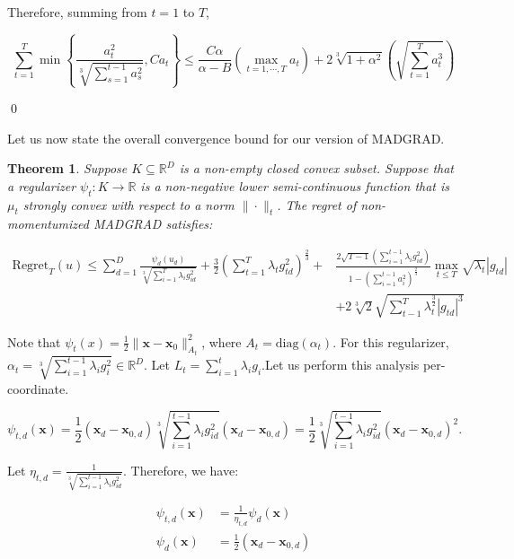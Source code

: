 \documentclass{article}
\newtheorem{theorem}{Theorem}[section]
\newcommand{\R}{\mathbb{R}}
\newcommand{\Regret}{\text{Regret}}
\newcommand{\diag}{\text{diag}}
\newcommand{\bx}{\mathbf{x}}
\begin{document}
Therefore, summing from $t=1$ to $T$,

\[
  \sum\limits_{t=1}^T\min \left\{ \frac{a_{t}^2}{\sqrt[3]{\sum\limits_{s=1}^{t-1} a_{s}^2}}, C a_t \right\} \leq \frac{C
  \alpha}{\alpha - B}\left(\max\limits_{t=1, \cdots, T} a_t\right) + 2 \sqrt[3]{1 +
  \alpha^2}\left(\sqrt{\sum\limits_{t=1}^T a_{t}^3}\right)
\]

\qed

Let us now state the overall convergence bound for our version of MADGRAD.

\begin{theorem} \label{theorem:1}
  Suppose $K \subseteq \R^D$ is a non-empty closed convex subset. Suppose that a regularizer $\psi_t: K \rightarrow \R$
  is a non-negative lower semi-continuous function that is $\mu_t$ strongly convex with respect to a norm $\| \cdot
  \|_t$. The regret of non-momentumized MADGRAD satisfies:

  \begin{align*}
    \Regret_T(u) \leq \sum\limits_{d=1}^D \frac{\psi_d(u_d)}{\sqrt[3]{\sum\limits_{i=1}^{T} \lambda_i
      g_{id}^2}} + \frac{3}{2}\left(\sum\limits_{t=1}^T \lambda_t g_{td}^2\right)^\frac{2}{3} +& \frac{2
      \sqrt{T-1}\left(\sum_{i=1}^{t-1} \lambda_i g_{id}^2\right)}{1 - \left( \sum_{i=1}^{t-1} a_{i}^2
    \right)^\frac{2}{3}} \max_{t \leq T} \sqrt{\lambda_t}|g_{td}| \\ &+ 2\sqrt[3]{2}\sqrt{\sum\limits_{t-1}^T
    \lambda_t^\frac{3}{2} |g_{td}|^3}
  \end{align*}
\end{theorem}

\proof Note that $\psi_t (x) = \frac{1}{2} \| \bx - \bx_0\|_{A_t}^2$, where $A_t = \diag(\alpha_t)$. For this
regularizer, $\alpha_t = \sqrt[3]{\sum\limits_{i=1}^{t-1} \lambda_i g_{i}^2} \in \R^D$. Let $L_t = \sum\limits_{i=1}^t
\lambda_i g_i$.Let us perform this analysis per-coordinate.

\[
  \psi_{t,d}(\bx) = \frac{1}{2} (\bx_d - \bx_{0,d})\sqrt[3]{\sum\limits_{i=1}^{t-1} \lambda_i g_{id}^2}(\bx_d -
  \bx_{0,d}) = \frac{1}{2}\sqrt[3]{\sum\limits_{i=1}^{t-1} \lambda_i g_{id}^2}(\bx_d - \bx_{0,d})^2.
\]

Let $\eta_{t,d} = \frac{1}{\sqrt[3]{\sum\limits_{i=1}^{t-1} \lambda_i g_{id}^2}}$. Therefore, we have:

\begin{align*}
  \psi_{t,d} (\bx) &= \frac{1}{\eta_{t,d}} \psi_d(\bx) \\
  \psi_d(\bx) &= \frac{1}{2} (\bx_d - \bx_{0,d})
\end{align*}
\end{document}
